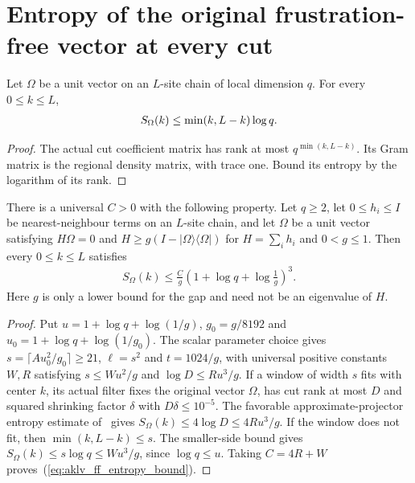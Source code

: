 \section{Entropy of the original frustration-free vector at every cut}

\begin{lemma}
    \label{lem:aklv_region_entropy_short_side}
    \leanok
    Let $\Omega$ be a unit vector on an $L$-site chain of local dimension
    $q$. For every $0\le k\le L$,
    \begin{align}
        S_\Omega(k)\le\min(k,L-k)\log q.
        \notag
    \end{align}
\end{lemma}
\begin{proof}\leanok
    The actual cut coefficient matrix has rank at most
    $q^{\min(k,L-k)}$. Its Gram matrix is the regional density matrix,
    with trace one. Bound its entropy by the logarithm of its rank.
\end{proof}

\begin{lemma}
    \label{lem:aklv_frustration_free_entropy_lower_gap}
    \leanok
    There is a universal $C>0$ with the following property. Let $q\ge2$,
    let $0\le h_i\le I$ be nearest-neighbour terms on an $L$-site chain,
    and let $\Omega$ be a unit vector satisfying
    $H\Omega=0$ and $H\ge g(I-|\Omega\rangle\langle\Omega|)$ for
    $H=\sum_i h_i$ and $0<g\le1$. Then every $0\le k\le L$ satisfies
    \begin{align}
        S_\Omega(k)\le\frac Cg
        \left(1+\log q+\log\frac1g\right)^3.
        \label{eq:aklv_ff_entropy_bound}
    \end{align}
    Here $g$ is only a lower bound for the gap and need not be an
    eigenvalue of $H$.
\end{lemma}
\begin{proof}\leanok
    Put $u=1+\log q+\log(1/g)$, $g_0=g/8192$ and
    $u_0=1+\log q+\log(1/g_0)$. The scalar parameter choice gives
    $s=\lceil Au_0^2/g_0\rceil\ge21$, $\ell=s^2$ and $t=1024/g$,
    with universal positive constants $W,R$ satisfying
    $s\le Wu^2/g$ and $\log D\le Ru^3/g$.
    If a window of width $s$ fits with center $k$, its actual filter
    fixes the original vector $\Omega$, has cut rank at most $D$ and
    squared shrinking factor $\delta$ with $D\delta\le10^{-5}$.
    The favorable approximate-projector entropy estimate
    of~\cite[Corollary~2.4]{Arad2013AreaLaw} gives
    $S_\Omega(k)\le4\log D\le4Ru^3/g$.
    If the window does not fit, then $\min(k,L-k)\le s$.
    The smaller-side bound gives
    $S_\Omega(k)\le s\log q\le Wu^3/g$, since $\log q\le u$.
    Taking $C=4R+W$ proves~(\ref{eq:aklv_ff_entropy_bound}).
\end{proof}

